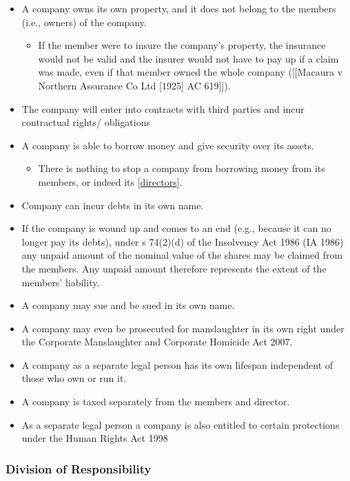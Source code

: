 \documentclass[
]{article}
\providecommand{\tightlist}{%
  \setlength{\itemsep}{0pt}\setlength{\parskip}{0pt}}
\begin{document}
\begin{itemize}
\tightlist
\item
  A company owns its own property, and it does not belong to the members
  (i.e., owners) of the company.

  \begin{itemize}
  \tightlist
  \item
    If the member were to insure the company's property, the insurance
    would not be valid and the insurer would not have to pay up if a
    claim was made, even if that member owned the whole company
    ({[}{[}Macaura v Northern Assurance Co Ltd {[}1925{]} AC 619{]}{]}).
  \end{itemize}
\item
  The company will enter into contracts with third parties and incur
  contractual rights/ obligations
\item
  A company is able to borrow money and give security over its assets.

  \begin{itemize}
  \tightlist
  \item
    There is nothing to stop a company from borrowing money from its
    members, or indeed its
    {[}\protect\hyperlink{directors-1}{directors}{]}.
  \end{itemize}
\item
  Company can incur debts in its own name.
\item
  If the company is wound up and comes to an end (e.g., because it can
  no longer pay its debts), under s 74(2)(d) of the Insolvency Act 1986
  (IA 1986) any unpaid amount of the nominal value of the shares may be
  claimed from the members. Any unpaid amount therefore represents the
  extent of the members' liability.
\item
  A company may sue and be sued in its own name.
\item
  A company may even be prosecuted for manslaughter in its own right
  under the Corporate Manslaughter and Corporate Homicide Act 2007.
\item
  A company as a separate legal person has its own lifespan independent
  of those who own or run it.
\item
  A company is taxed separately from the members and director.
\item
  As a separate legal person a company is also entitled to certain
  protections under the Human Rights Act 1998
\end{itemize}

\hypertarget{division-of-responsibility}{%
\subsubsection{Division of
Responsibility}\label{division-of-responsibility}}
\end{document}
